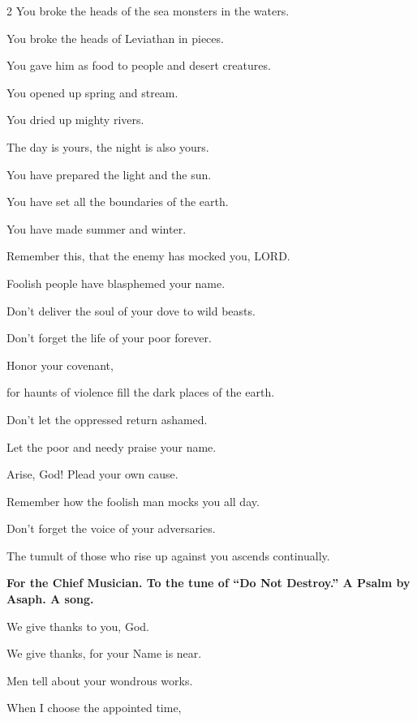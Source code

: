 \begin{multicols}{2}
	You broke the heads of the sea monsters in the waters.
	
	
	\myverse{}You broke the heads of Leviathan in pieces.
	
	You gave him as food to people and desert creatures.
	
	
	\myverse{}You opened up spring and stream.
	
	You dried up mighty rivers.
	
	
	\myverse{}The day is yours, the night is also yours.
	
	You have prepared the light and the sun.
	
	
	\myverse{}You have set all the boundaries of the earth.
	
	You have made summer and winter.
	
	\vspace{\baselineskip}
	
	\myverse{}Remember this, that the enemy has mocked you, LORD.
	
	Foolish people have blasphemed your name.
	
	
	\myverse{}Don’t deliver the soul of your dove to wild beasts.
	
	Don’t forget the life of your poor forever.
	
	
	\myverse{}Honor your covenant,
	
	for haunts of violence fill the dark places of the earth.
	
	
	\myverse{}Don’t let the oppressed return ashamed.
	
	Let the poor and needy praise your name.
	
	
	\myverse{}Arise, God! Plead your own cause.
	
	Remember how the foolish man mocks you all day.
	
	
	\myverse{}Don’t forget the voice of your adversaries.
	
	The tumult of those who rise up against you ascends continually.
	
	
	
	\mychapter{}\textbf{For the Chief Musician. To the tune of “Do Not Destroy.” A Psalm by Asaph. A song.}
	
	\myverse*{}We give thanks to you, God.
	
	We give thanks, for your Name is near.
	
	Men tell about your wondrous works.
	
	\vspace{\baselineskip}
	
	\myverse{}When I choose the appointed time,
	

\end{multicols}
